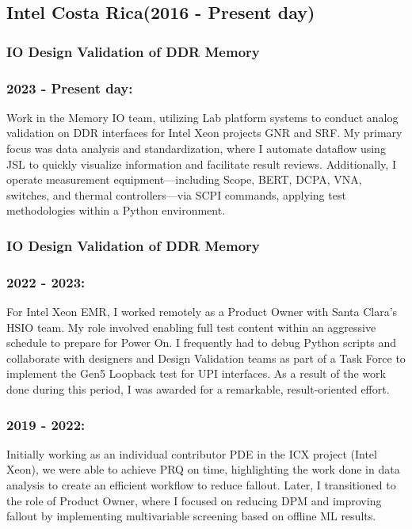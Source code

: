 \documentclass{article}
\begin{document}
\subsection{Intel Costa Rica(2016 - Present day)}
\subsubsection{IO Design Validation of DDR Memory}
\subsubsection{2023 - Present day: }
Work in the Memory IO team, utilizing Lab platform systems to conduct analog validation on DDR interfaces for Intel Xeon projects GNR and SRF. My primary focus was data analysis and standardization, where I automate dataflow using JSL to quickly visualize information and facilitate result reviews. Additionally, I operate measurement equipment—including Scope, BERT, DCPA, VNA, switches, and thermal controllers—via SCPI commands, applying test methodologies within a Python environment.
\subsubsection{IO Design Validation of DDR Memory}
\subsubsection{2022 - 2023: }
For Intel Xeon EMR, I worked remotely as a Product Owner with Santa Clara’s HSIO team. My role involved enabling full test content within an aggressive schedule to prepare for Power On. I frequently had to debug Python scripts and collaborate with designers and Design Validation teams as part of a Task Force to implement the Gen5 Loopback test for UPI interfaces. As a result of the work done during this period, I was awarded for a remarkable, result-oriented effort.
\subsubsection{2019 - 2022: }
Initially working as an individual contributor PDE in the ICX project (Intel Xeon), we were able to achieve PRQ on time, highlighting the work done in data analysis to create an efficient workflow to reduce fallout. Later, I transitioned to the role of Product Owner, where I focused on reducing DPM and improving fallout by implementing multivariable screening based on offline ML results.
\end{document}

